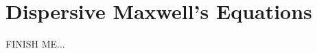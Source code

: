 \documentclass{article}
\newcommand{\red}{\color{red}}
\begin{document}
\clearpage
\section{Dispersive Maxwell's Equations}

{\red FINISH ME...}







\appendix


\vfill\eject
% 



\printindex
\end{document}
